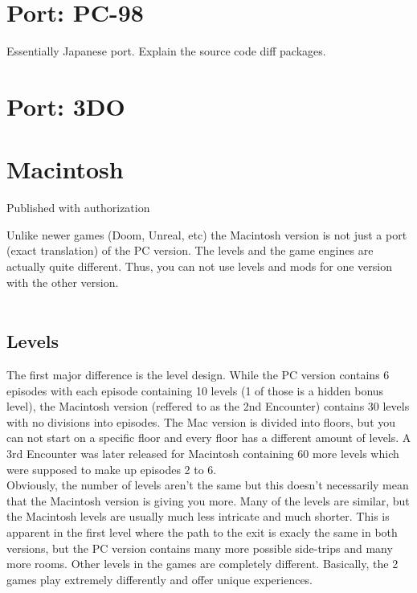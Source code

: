 \documentclass[book.tex]{subfiles}
\begin{document}
\section{Port: PC-98}
Essentially Japanese port. Explain the source code diff packages.
\section{Port: 3DO}
\section{Macintosh}

Published with authorization

Unlike newer games (Doom, Unreal, etc) the Macintosh version is not just a port (exact translation) of the PC version. The levels and the game engines are actually quite different. Thus, you can not use levels and mods for one version with the other version.\\
\\
\subsection{Levels}

The first major difference is the level design. While the PC version contains 6 episodes with each episode containing 10 levels (1 of those is a hidden bonus level), the Macintosh version (reffered to as the 2nd Encounter) contains 30 levels with no divisions into episodes. The Mac version is divided into floors, but you can not start on a specific floor and every floor has a different amount of levels. A 3rd Encounter was later released for Macintosh containing 60 more levels which were supposed to make up episodes 2 to 6.\\
Obviously, the number of levels aren't the same but this doesn't necessarily mean that the Macintosh version is giving you more. Many of the levels are similar, but the Macintosh levels are usually much less intricate and much shorter. This is apparent in the first level where the path to the exit is exacly the same in both versions, but the PC version contains many more possible side-trips and many more rooms. Other levels in the games are completely different. Basically, the 2 games play extremely differently and offer unique experiences.
\end{document}
